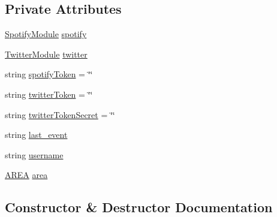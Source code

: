 \subsection*{Private Attributes}
\begin{DoxyCompactItemize}
\item 
\mbox{\hyperlink{classArea_1_1Models_1_1SpotifyModule}{Spotify\+Module}} \mbox{\hyperlink{classArea_1_1Models_1_1SpotifyTwitterArea_aea71fea64bde5a55bedd03cfd3cc6d3a}{spotify}}
\item 
\mbox{\hyperlink{classArea_1_1Models_1_1TwitterModule}{Twitter\+Module}} \mbox{\hyperlink{classArea_1_1Models_1_1SpotifyTwitterArea_aa03d3340acd3ce9fec983e7fddbd4285}{twitter}}
\item 
string \mbox{\hyperlink{classArea_1_1Models_1_1SpotifyTwitterArea_a03dccdf659f4b50e42af262da433c5e6}{spotify\+Token}} = \char`\"{}\char`\"{}
\item 
string \mbox{\hyperlink{classArea_1_1Models_1_1SpotifyTwitterArea_ab275083e018557822cc19b091800086b}{twitter\+Token}} = \char`\"{}\char`\"{}
\item 
string \mbox{\hyperlink{classArea_1_1Models_1_1SpotifyTwitterArea_a1885cd7ba914b02acedbbda8e335e5bd}{twitter\+Token\+Secret}} = \char`\"{}\char`\"{}
\item 
string \mbox{\hyperlink{classArea_1_1Models_1_1SpotifyTwitterArea_aff2ef8653bba337b9c56e48b71d7d3ca}{last\+\_\+event}}
\item 
string \mbox{\hyperlink{classArea_1_1Models_1_1SpotifyTwitterArea_aae8f07752b2dba87df70bec18efb42c5}{username}}
\item 
\mbox{\hyperlink{classArea_1_1Models_1_1AREA}{A\+R\+EA}} \mbox{\hyperlink{classArea_1_1Models_1_1SpotifyTwitterArea_a50307f9bb36968806af0a2bcca474e3c}{area}}
\end{DoxyCompactItemize}


\subsection{Constructor \& Destructor Documentation}
\mbox{\label{classArea_1_1Models_1_1SpotifyTwitterArea_ac1f04eeaee3f2e91e432175669170069}} 
